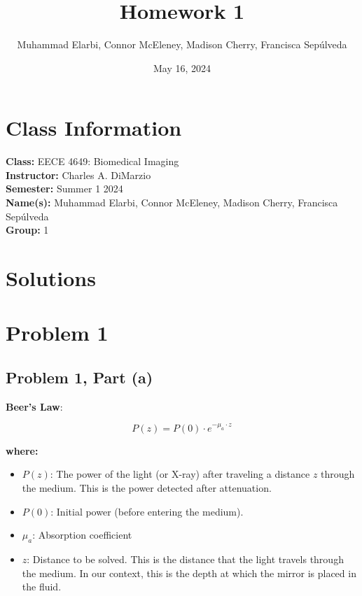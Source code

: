 \documentclass[12pt]{article}
\begin{document}
\title{Homework 1}
\author{Muhammad Elarbi, Connor McEleney, Madison Cherry, Francisca Sepúlveda}
\date{May 16, 2024}
\maketitle

\section*{Class Information}
\textbf{Class:} EECE 4649: Biomedical Imaging \\
\textbf{Instructor:} Charles A. DiMarzio \\
\textbf{Semester:} Summer 1 2024 \\
\textbf{Name(s):} Muhammad Elarbi, Connor McEleney, Madison Cherry, Francisca Sepúlveda \\
\textbf{Group:} 1

\newpage
{} %
\setcounter{page}{1} %
\tableofcontents


\newpage
\section*{Solutions}
\section*{Problem 1}
\subsection*{Problem 1, Part (a)}
\textbf{Beer's Law}:

\[ P(z) = P(0) \cdot e^{-\mu_a \cdot z} \]

\textbf{where:}
\begin{itemize}
    \item \( P(z) \): The power of the light (or X-ray) after traveling a distance \( z \) through the medium. This is the power detected after attenuation.
    \item \( P(0) \): Initial power (before entering the medium).
    \item \( \mu_a \): Absorption coefficient
    \item \( z \): Distance to be solved. This is the distance that the light travels through the medium. In our context, this is the depth at which the mirror is placed in the fluid.
\end{itemize}
\end{document}
